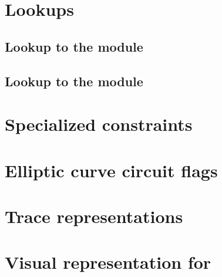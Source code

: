 \section{Lookups}
\subsection{Lookup to the \wcpMod{} module}                                 \label{ec data: lookups: wcp}                                       
\subsection{Lookup to the \extMod{} module}                                 \label{ec data: lookups: ext}                                       

\section{Specialized constraints}                                           \label{ec data: specialized constraints}                            

\section{Elliptic curve circuit flags}                                      \label{ec data: circuits}                                           

\newpage
\section{Trace representations}                                             \label{ec data: trace representations}                              
\section{Visual representation for }                        \label{ec data: visual representation of ecpairing}                 
